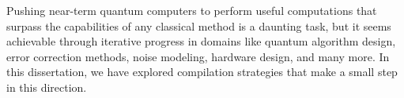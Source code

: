 Pushing near-term quantum computers to perform useful computations that surpass the capabilities of any classical method is a daunting task, but it seems achievable through iterative progress in domains like quantum algorithm design, error correction methods, noise modeling, hardware design, and many more. In this dissertation, we have explored compilation strategies that make a small step in this direction.

